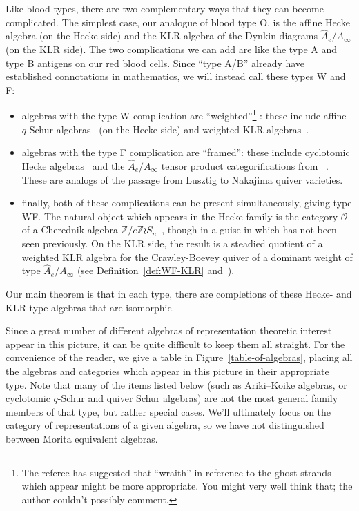 \documentclass[10pt]{article}
\theoremstyle{definition}
\newcommand{\Z}{\mathbb{Z}}
\newcommand{\cO}{\mathcal{O}}
\begin{document}
Like blood types, there are two complementary ways that they can
become complicated. The simplest case, our analogue of blood type O,
is the affine Hecke algebra (on the Hecke side) and the KLR algebra of
the Dynkin diagrams $\hat{A}_e/A_\infty$ (on the KLR side). The two complications we can
add are like the type A and type B antigens on our red blood cells.
Since ``type A/B'' already have established connotations in
mathematics, we will instead call these types W and F:
\begin{itemize} 
\item algebras with the type W complication are ``weighted''\footnote{The referee has suggested that
 ``wraith'' in reference to the ghost strands which appear might be
 more appropriate. You might very well think that; the author couldn't possibly comment.} : these
 include affine $q$-Schur algebras~\cite{GreenSchur} (on the Hecke side) and weighted KLR
 algebras~\cite{WebwKLR}.
\item algebras with the type F complication are 
 ``framed'': these include cyclotomic Hecke algebras~\cite{AK} and the
 $\hat{A}_e/A_\infty$ tensor product categorifications from
~\cite{Webmerged}. These are analogs of the passage from Lusztig to
 Nakajima quiver varieties.
\item finally, both of these complications can be present
 simultaneously, giving type WF. The natural object which appears in
 the Hecke family is the category $\cO$ of a Cherednik algebra $\Z/e\Z\wr
 S_n$~\cite{GGOR}, though in a guise in which has not been seen previously. On
 the KLR side, the result is a steadied quotient of a weighted KLR
 algebra for the Crawley-Boevey quiver of a dominant weight of type
 $\hat{A}_e/A_\infty$ (see Definition~\ref{def:WF-KLR} and~\cite[\S~3.1]{WebwKLR}).
\end{itemize}

Our main theorem is that in each type, there are completions of these
Hecke- and KLR-type algebras that are isomorphic.

Since a great number of different algebras of representation theoretic
interest appear in this picture, it can be quite difficult to keep
them all straight. For the convenience of the reader, we give a table
in Figure~\ref{table-of-algebras}, placing all the algebras and categories which appear in this picture in their
appropriate type. Note that many of the items listed below (such as
Ariki--Koike algebras, or cyclotomic $q$-Schur and quiver Schur
algebras) are not the most general family members of that type, but
rather special cases. We'll ultimately focus on the category of
representations of a given algebra, so we have not
distinguished between Morita equivalent algebras. 
\end{document}
